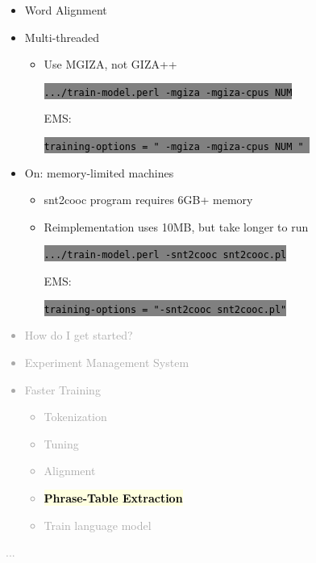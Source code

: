 \documentclass[landscape]{uedslides2C}
\newcommand{\currenttopic}[1]{\colorbox{lightyellow}{\textcolor{black}{\bf #1}}}
\newcommand{\littlecode}[1]{\colorbox{gray}{\textcolor{black}{\small \tt #1}}}
\begin{document}


\begin{itemize} \itemsep -1mm

\item {Word Alignment}
\item {Multi-threaded}
  \begin{itemize}
  \item    Use MGIZA, not GIZA++
  \begin{center}
    \littlecode{.../train-model.perl -mgiza -mgiza-cpus NUM} 
  \end{center}      
  EMS: 
  \begin{center}
    \littlecode{training-options = " -mgiza -mgiza-cpus NUM " } 
  \end{center}      
  \end{itemize}

\item {On: memory-limited machines}
  \begin{itemize}
  \item snt2cooc program requires 6GB+ memory
  \item Reimplementation uses 10MB, but take longer to run
  \begin{center}
    \littlecode{.../train-model.perl -snt2cooc snt2cooc.pl} 
  \end{center}      
  EMS:
  \begin{center}
    \littlecode{training-options = "-snt2cooc snt2cooc.pl"}
  \end{center}      

  \end{itemize}
\end{itemize}
       


\vspace{-5mm}
\textcolor{darkgrey}{
\begin{itemize} \itemsep -1mm
\item {How do I get started?}
\item {Experiment Management System}
\item {Faster Training}
  \begin{itemize}
  \item {Tokenization}
  \item {Tuning}
  \item {Alignment}
  \item \currenttopic{Phrase-Table Extraction}
  \item Train language model
  \end{itemize}
\end{itemize}
...
}
\end{document}
